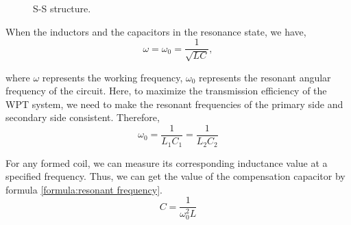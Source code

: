 \begin{figure}[!t]
    \centering
    \caption{S-S structure.}
    \label{fig:ss topology}
\end{figure}

When the inductors and the capacitors in the resonance state, we have,
\begin{equation}
    \omega=\omega _0=\frac{1}{\sqrt{LC}},
    \label{formula:resonant frequency}
\end{equation}

where $\omega$ represents the working frequency, $\omega _0$ represents the resonant angular frequency of the circuit. Here, to maximize the transmission efficiency of the WPT system, we need to make the resonant frequencies of the primary side and secondary side consistent. Therefore,
\begin{equation}
    \omega _0 = \frac{1}{L_1C_1} = \frac{1}{L_2C_2}
\end{equation}

For any formed coil, we can measure its corresponding inductance value at a specified frequency. Thus, we can get the value of the compensation capacitor by formula \ref{formula:resonant frequency}.
\begin{equation}
    C = \frac{1}{\omega_0^2 L}
\end{equation}

